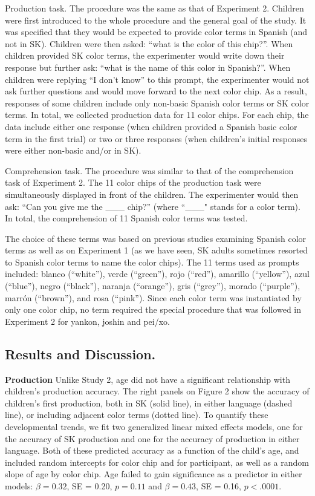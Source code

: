 \documentclass[floatsintext,man]{apa6}
\theoremstyle{definition}
\theoremstyle{definition}
\theoremstyle{definition}
\theoremstyle{remark}
\begin{document}
Production task. The procedure was the same as that of Experiment 2.
Children were first introduced to the whole procedure and the general
goal of the study. It was specified that they would be expected to
provide color terms in Spanish (and not in SK). Children were then
asked: \enquote{what is the color of this chip?}. When children provided
SK color terms, the experimenter would write down their response but
further ask: \enquote{what is the name of this color in Spanish?}. When
children were replying \enquote{I don't know} to this prompt, the
experimenter would not ask further questions and would move forward to
the next color chip. As a result, responses of some children include
only non-basic Spanish color terms or SK color terms. In total, we
collected production data for 11 color chips. For each chip, the data
include either one response (when children provided a Spanish basic
color term in the first trial) or two or three responses (when
children's initial responses were either non-basic and/or in SK).

Comprehension task. The procedure was similar to that of the
comprehension task of Experiment 2. The 11 color chips of the production
task were simultaneously displayed in front of the children. The
experimenter would then ask: \enquote{Can you give me the \_\_\_ chip?}
(where ``\_\_\_" stands for a color term). In total, the comprehension
of 11 Spanish color terms was tested.

The choice of these terms was based on previous studies examining
Spanish color terms as well as on Experiment 1 (as we have seen, SK
adults sometimes resorted to Spanish color terms to name the color
chips). The 11 terms used as prompts included: blanco (\enquote{white}),
verde (\enquote{green}), rojo (\enquote{red}), amarillo
(\enquote{yellow}), azul (\enquote{blue}), negro (\enquote{black}),
naranja (\enquote{orange}), gris (\enquote{grey}), morado
(\enquote{purple}), marrón (\enquote{brown}), and rosa (\enquote{pink}).
Since each color term was instantiated by only one color chip, no term
required the special procedure that was followed in Experiment 2 for
yankon, joshin and pei/xo.

\subsection{Results and Discussion.}\label{results-and-discussion.}

\textbf{Production} Unlike Study 2, age did not have a significant
relationship with children's production accuracy. The right panels on
Figure 2 show the accuracy of children's first production, both in SK
(solid line), in either language (dashed line), or including adjacent
color terms (dotted line). To quantify these developmental trends, we
fit two generalized linear mixed effects models, one for the accuracy of
SK production and one for the accuracy of production in either language.
Both of these predicted accuracy as a function of the child's age, and
included random intercepts for color chip and for participant, as well
as a random slope of age by color chip. Age failed to gain significance
as a predictor in either models: \(\beta = 0.32\), SE = 0.20,
\(p = 0.11\) and \(\beta = 0.43\), SE = 0.16, \(p < .0001\).
\end{document}
